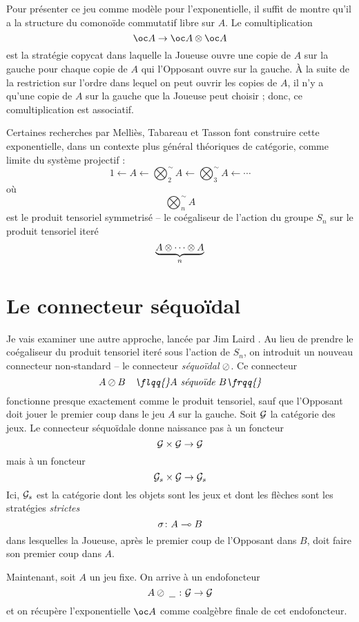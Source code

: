 \documentclass[11pt]{article}
\begin{document}
Pour pr\'{e}senter ce jeu comme mod\`{e}le pour l'exponentielle, il suffit de montre qu'il a la structure du comono\"{i}de commutatif libre sur $A$.  Le comultiplication
\[
  \oc A \to \oc A \tensor \oc A
  \]
est la strat\'{e}gie \flqq{}copycat\frqq{} dans laquelle la Joueuse ouvre une copie de $A$ sur la gauche pour chaque copie de $A$ qui l'Opposant ouvre sur la gauche.  \`{A} la suite de la restriction sur l'ordre dans lequel on peut ouvrir les copies de $A$, il n'y a qu'une copie de $A$ sur la gauche que la Joueuse peut choisir ; donc, ce comultiplication est associatif.  

Certaines recherches par Melli\`{e}s, Tabareau et Tasson \cite{MelliesCofCommCom} font construire cette exponentielle, dans un contexte plus g\'{e}n\'{e}ral th\'{e}oriques de cat\'{e}gorie, comme limite du syst\`{e}me projectif :
\[
  1 \leftarrow A \leftarrow \bigotimes_2^{\sim} A \leftarrow \bigotimes_3^{\sim} A \leftarrow \cdots
  \]
o\`{u} 
\[
  \bigotimes_n^\sim A
  \]
est le produit tensoriel symmetris\'{e} -- le co\'{e}galiseur de l'action du groupe $S_n$ sur le produit tensoriel iter\'{e}
\[
  \underbrace{A \otimes \cdots \otimes A}_{n}
  \]

\section{Le connecteur s\'{e}quo\"{i}dal}

Je vais examiner une autre approche, lanc\'{e}e par Jim Laird \cite{laird02}.  Au lieu de prendre le co\'{e}galiseur du produit tensoriel iter\'{e} sous l'action de $S_n$, on introduit un nouveau connecteur non-standard -- le connecteur \emph{s\'{e}quo\"{i}dal} $\oslash$.  Ce connecteur
\[
  A \sequoid B \quad \textit{\flqq{}$A$ s\'{e}quo\"{i}de $B$\frqq{}}
  \]
fonctionne presque exactement comme le produit tensoriel, sauf que l'Opposant doit jouer le premier coup dans le jeu $A$ sur la gauche.  Soit $\mathcal G$ la cat\'{e}gorie des jeux.  Le connecteur s\'{e}quo\"{i}dale donne naissance pas \`{a} un foncteur
\[
  \mathcal G\times\mathcal G\to\mathcal G
  \]
mais \`{a} un foncteur
\[
  \mathcal G_s\times\mathcal G\to\mathcal G_s
  \]
Ici, $\mathcal G_s$ est la cat\'{e}gorie dont les objets sont les jeux et dont les fl\`{e}ches sont les strat\'{e}gies \emph{strictes}
\[
  \sigma\colon A\multimap B
  \]
dans lesquelles la Joueuse, apr\`{e}s le premier coup de l'Opposant dans $B$, doit faire son premier coup dans $A$.  

Maintenant, soit $A$ un jeu fixe.  On arrive \`{a} un endofoncteur
\[
  A\oslash\;\underline{\hspace{1.5ex}}\; \colon \mathcal G \to \mathcal G
  \]
et on r\'{e}cup\`{e}re l'exponentielle $\oc A$ comme coalg\`{e}bre finale de cet endofoncteur.  
\end{document}
